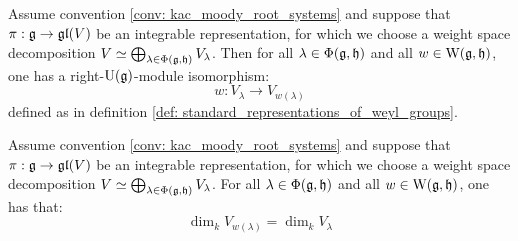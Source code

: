             \begin{proposition} \label{prop: weyl_group_permute_root_spaces_of_kac_moody_algebras}
                \cite[Proposition 5.2.6]{perrin_kac_moody_algebras} Assume convention \ref{conv: kac_moody_root_systems} and suppose that $\pi: \mathfrak{g} \to \mathfrak{gl}(V)$ be an integrable representation, for which we choose a weight space decomposition $V \simeq \bigoplus_{\lambda \in \Phi(\mathfrak{g}, \mathfrak{h})} V_{\lambda}$. Then for all $\lambda \in \Phi(\mathfrak{g}, \mathfrak{h})$ and all $w \in \mathrm{W}(\mathfrak{g}, \mathfrak{h})$, one has a right-$\mathrm{U}(\mathfrak{g})$-module isomorphism:
                    $$w: V_{\lambda} \to V_{w(\lambda)}$$
                defined as in definition \ref{def: standard_representations_of_weyl_groups}.
            \end{proposition}
            \begin{corollary} \label{coro: weyl_groups_perserve_multiplicities}
                Assume convention \ref{conv: kac_moody_root_systems} and suppose that $\pi: \mathfrak{g} \to \mathfrak{gl}(V)$ be an integrable representation, for which we choose a weight space decomposition $V \simeq \bigoplus_{\lambda \in \Phi(\mathfrak{g}, \mathfrak{h})} V_{\lambda}$. For all $\lambda \in \Phi(\mathfrak{g}, \mathfrak{h})$ and all $w \in \mathrm{W}(\mathfrak{g}, \mathfrak{h})$, one has that:
                    $$\dim_k V_{w(\lambda)} = \dim_k V_{\lambda}$$
            \end{corollary}
                
